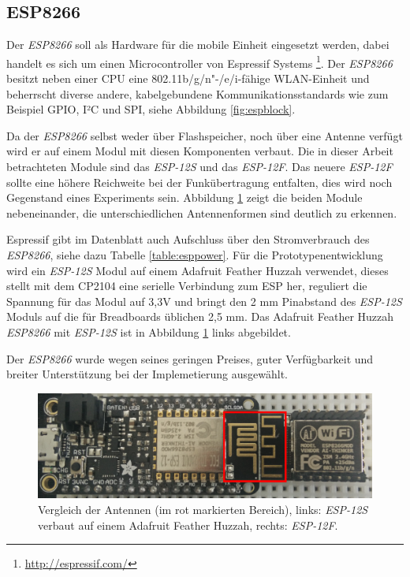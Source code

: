 \subsection{ESP8266}
Der \emph{ESP8266} soll als Hardware für die mobile Einheit eingesetzt werden, dabei handelt es sich um einen Microcontroller von Espressif Systems \footnote{\url{http://espressif.com/}}.
Der \emph{ESP8266} besitzt neben einer CPU eine 802.11b/g/n"-/e/i-fähige WLAN-Einheit und beherrscht diverse andere, kabelgebundene Kommunikationsstandards wie zum Beispiel GPIO, I²C und SPI, siehe Abbildung \ref{fig:espblock}. 

Da der \emph{ESP8266} selbst weder über Flashspeicher, noch über eine Antenne verfügt wird er auf einem Modul mit diesen Komponenten verbaut. 
Die in dieser Arbeit betrachteten Module sind das \emph{ESP-12S} und das \emph{ESP-12F}.
Das neuere \emph{ESP-12F} sollte eine höhere Reichweite bei der Funkübertragung entfalten, dies wird noch Gegenstand eines Experiments sein.
Abbildung \ref{fig:espmodules} zeigt die beiden Module nebeneinander, die unterschiedlichen Antennenformen sind deutlich zu erkennen.

Espressif gibt im Datenblatt auch Aufschluss über den Stromverbrauch des \emph{ESP8266}, siehe dazu Tabelle \ref{table:esppower}.
Für die Prototypenentwicklung wird ein \emph{ESP-12S} Modul auf einem Adafruit Feather Huzzah verwendet, dieses stellt mit dem CP2104 eine serielle Verbindung zum ESP her, reguliert die Spannung für das Modul auf 3,3V und bringt den 2 mm Pinabstand des \emph{ESP-12S} Moduls auf die für Breadboards üblichen 2,5 mm.
Das Adafruit Feather Huzzah \emph{ESP8266} mit \emph{ESP-12S} ist in Abbildung \ref{fig:espmodules} links abgebildet.

Der \emph{ESP8266} wurde wegen seines geringen Preises, guter Verfügbarkeit und breiter Unterstützung bei der Implemetierung ausgewählt.

\begin{figure}[h]
  \centering
	\includegraphics[width=\textwidth]{images/espmodules.png}
  \caption{Vergleich der Antennen (im rot markierten Bereich), links: \emph{ESP-12S} verbaut auf einem Adafruit Feather Huzzah, rechts: \emph{ESP-12F}.}
  \label{fig:espmodules}
\end{figure}

